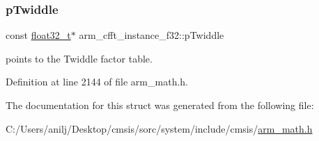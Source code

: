 \subsubsection{\texorpdfstring{p\+Twiddle}{pTwiddle}}
{\footnotesize\ttfamily const \hyperlink{arm__math_8h_a4611b605e45ab401f02cab15c5e38715}{float32\+\_\+t}$\ast$ arm\+\_\+cfft\+\_\+instance\+\_\+f32\+::p\+Twiddle}

points to the Twiddle factor table. 

Definition at line 2144 of file arm\+\_\+math.\+h.



The documentation for this struct was generated from the following file\+:\begin{DoxyCompactItemize}
\item 
C\+:/\+Users/anilj/\+Desktop/cmsis/sorc/system/include/cmsis/\hyperlink{arm__math_8h}{arm\+\_\+math.\+h}\end{DoxyCompactItemize}
